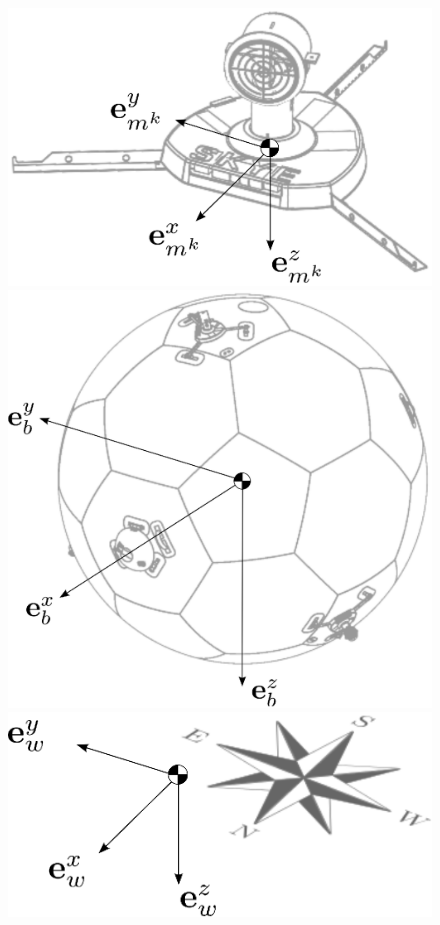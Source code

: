\begin{figure}[hbtp]
\captionsetup{width=0.9\textwidth}
\centering
\includegraphics[scale=.4]{images/intro/motor_frame.eps}
\includegraphics[scale=.4]{images/intro/blimp_frame.eps} \\
\includegraphics[scale=.4]{images/intro/world_frame.eps}

\end{figure}
